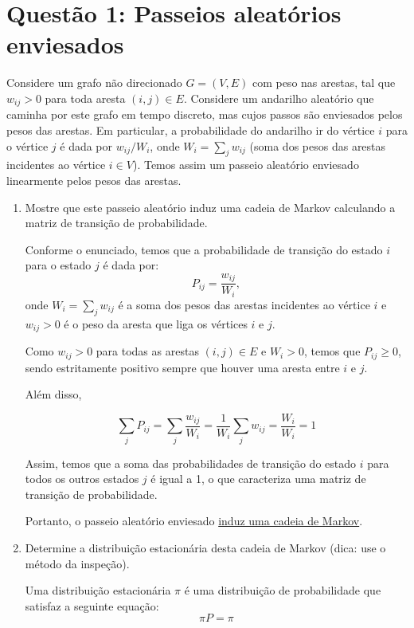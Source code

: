 \section*{Questão 1: Passeios aleatórios enviesados}
Considere um grafo não direcionado $G = (V,E)$ com peso nas arestas, tal que $w_{ij} > 0$ para toda aresta $(i, j) \in E$. Considere um andarilho aleatório que caminha por este grafo em tempo discreto, mas cujos passos são enviesados pelos pesos das arestas. Em particular, a probabilidade do andarilho ir do vértice $i$ para o vértice $j$ é dada por $w_{ij}/W_i$, onde $W_i = \sum_j w_{ij}$ (soma dos pesos das arestas incidentes ao vértice $i \in V$). Temos assim um passeio aleatório enviesado linearmente pelos pesos das arestas.

\begin{enumerate}
    \item Mostre que este passeio aleatório induz uma cadeia de Markov calculando a matriz de transição de probabilidade.
    \begin{resposta}
        
    Conforme o enunciado, temos que a probabilidade de transição do estado $i$ para o estado $j$ é dada por:
    $$ P_{ij} = \frac{w_{ij}}{W_i}, $$
    onde $W_i = \sum_{j} w_{ij}$ é a soma dos pesos das arestas incidentes ao vértice $i$ e $w_{ij}>0$ é o peso da aresta que liga os vértices $i$ e $j$.

    Como $w_{ij} > 0$ para todas as arestas $(i,j) \in E$ e $W_i > 0$, temos que $P_{ij} \geq 0$, sendo estritamente positivo sempre que houver uma aresta entre $i$ e $j$.

    
    Além disso,

    $$ \sum_{j} P_{ij} = \sum_{j} \frac{w_{ij}}{W_i} = \frac{1}{W_i} \sum_{j} w_{ij} = \frac{W_i}{W_i} = 1 $$

    Assim, temos que a soma das probabilidades de transição do estado $i$ para todos os outros estados $j$ é igual a 1, o que caracteriza uma matriz de transição de probabilidade. 
    
    Portanto, o passeio aleatório enviesado \underline{induz uma cadeia de Markov}.
        
    \end{resposta}
    \item Determine a distribuição estacionária desta cadeia de Markov (dica: use o método da inspeção).
    \begin{resposta}
        Uma distribuição estacionária $\pi$ é uma distribuição de probabilidade que satisfaz a seguinte equação:
        $$ \pi P = \pi $$


\end{resposta}
\end{enumerate}
